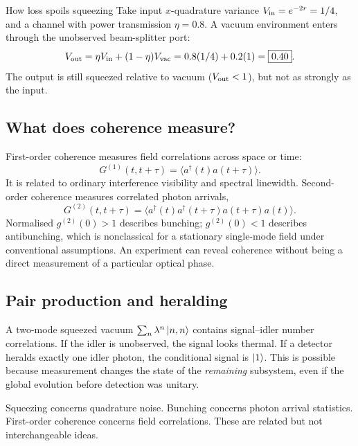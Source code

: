\begin{worked}{How loss spoils squeezing}
Take input \(x\)-quadrature variance
\(V_{\rm in}=e^{-2r}=1/4\), and a channel
with power transmission \(\eta=0.8\).
A vacuum environment enters through the
unobserved beam-splitter port:
\[
V_{\rm out}=\eta V_{\rm in}+(1-\eta)V_{\rm vac}
=0.8(1/4)+0.2(1)=\boxed{0.40}.
\]
The output is still squeezed relative
to vacuum (\(V_{\rm out}<1\)), but
not as strongly as the input.
\end{worked}

\subsection{What does coherence measure?}
First-order coherence measures field
correlations across space or time:
\[
G^{(1)}(t,t+\tau)
=\langle a^\dagger(t)a(t+\tau)\rangle.
\]
It is related to ordinary interference
visibility and spectral linewidth.
Second-order coherence measures correlated
photon arrivals,
\[
G^{(2)}(t,t+\tau)=
\langle a^\dagger(t)a^\dagger(t+\tau)
a(t+\tau)a(t)\rangle.
\]
Normalised \(g^{(2)}(0)>1\) describes
bunching; \(g^{(2)}(0)<1\) describes
antibunching, which is nonclassical
for a stationary single-mode field
under conventional assumptions.
An experiment can reveal coherence
without being a direct measurement
of a particular optical phase.

\subsection{Pair production and heralding}
A two-mode squeezed vacuum
\(\sum_n\lambda^n\left\lvert n,n\right\rangle\)
contains signal--idler number correlations.
If the idler is unobserved,
the signal looks thermal. If a detector
heralds exactly one idler photon,
the conditional signal is \(\left\lvert 1\right\rangle\).
This is possible because measurement
changes the state of the \emph{remaining}
subsystem, even if the global evolution
before detection was unitary.

\begin{checkpoint}
Squeezing concerns quadrature noise.
Bunching concerns photon arrival statistics.
First-order coherence concerns field
correlations. These are related but
not interchangeable ideas.
\end{checkpoint}
